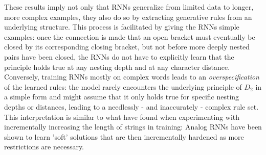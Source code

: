 These results imply not only that RNNs generalize from limited data to longer, more complex examples, they also do so by extracting generative rules from an underlying structure. This process is facilitated by giving the RNNs simple examples: once the connection is made that an open bracket must eventually be closed by its corresponding closing bracket, but not before more deeply nested pairs have been closed, the RNNs do not have to explicitly learn that the principle holds true at any nesting depth and at any character distance. Conversely, training RNNs mostly on complex words leads to an \textit{overspecification} of the learned rules: the model rarely encounters the underlying principle of $D_{2}$ in a simple form and might assume that it only holds true for specific nesting depths or distances, leading to a needlessly - and inaccurately - complex rule set. This interpretation is similar to what \cite{Zeng1993} have found when experimenting with incrementally increasing the length of strings in training: Analog RNNs have been shown to learn 'soft' solutions that are then incrementally hardened as more restrictions are necessary.